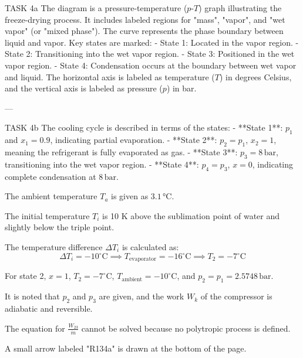 TASK 4a  
The diagram is a pressure-temperature (\( p \)-\( T \)) graph illustrating the freeze-drying process. It includes labeled regions for "mass", "vapor", and "wet vapor" (or "mixed phase"). The curve represents the phase boundary between liquid and vapor. Key states are marked:  
- State 1: Located in the vapor region.  
- State 2: Transitioning into the wet vapor region.  
- State 3: Positioned in the wet vapor region.  
- State 4: Condensation occurs at the boundary between wet vapor and liquid.  
The horizontal axis is labeled as temperature (\( T \)) in degrees Celsius, and the vertical axis is labeled as pressure (\( p \)) in bar.

---

TASK 4b  
The cooling cycle is described in terms of the states:  
- **State 1**: \( p_1 \) and \( x_1 = 0.9 \), indicating partial evaporation.  
- **State 2**: \( p_2 = p_1 \), \( x_2 = 1 \), meaning the refrigerant is fully evaporated as gas.  
- **State 3**: \( p_3 = 8 \, \text{bar} \), transitioning into the wet vapor region.  
- **State 4**: \( p_4 = p_3 \), \( x = 0 \), indicating complete condensation at \( 8 \, \text{bar} \).  

The ambient temperature \( T_a \) is given as \( 3.1 \, \text{°C} \).  

The initial temperature \( T_i \) is 10 K above the sublimation point of water and slightly below the triple point.  

The temperature difference \( \Delta T_i \) is calculated as:  
\[
\Delta T_i = -10^\circ\text{C} \implies T_{\text{evaporator}} = -16^\circ\text{C} \implies T_2 = -7^\circ\text{C}
\]

For state 2, \( x = 1 \), \( T_2 = -7^\circ\text{C} \), \( T_{\text{ambient}} = -10^\circ\text{C} \), and \( p_2 = p_1 = 2.5748 \, \text{bar} \).  

It is noted that \( p_2 \) and \( p_3 \) are given, and the work \( W_k \) of the compressor is adiabatic and reversible.  

The equation for \( \frac{W_{23}}{\dot{m}} \) cannot be solved because no polytropic process is defined.  

A small arrow labeled "R134a" is drawn at the bottom of the page.